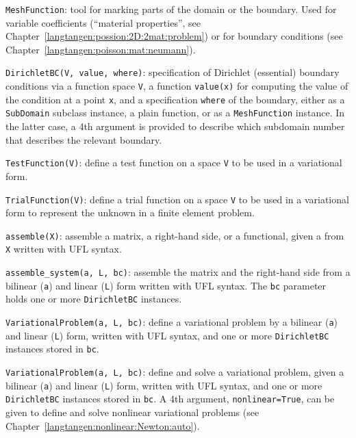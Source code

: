 {\fontsize{12pt}{12pt}\texttt{MeshFunction}}: tool for marking parts of the domain or the boundary.
Used for variable coefficients (``material properties'', see
Chapter~\ref{langtangen:possion:2D:2mat:problem}) or for
boundary conditions (see Chapter~\ref{langtangen:poisson:mat:neumann}).\gln

{\fontsize{12pt}{12pt}\texttt{DirichletBC(V, value, where)}}: specification of Dirichlet (essential)
boundary conditions via a function space {\fontsize{12pt}{12pt}\texttt{V}}, a function
{\fontsize{12pt}{12pt}\texttt{value(x)}} for computing the value of the condition at a point {\fontsize{12pt}{12pt}\texttt{x}},
and a specification {\fontsize{12pt}{12pt}\texttt{where}} of the boundary, either as a
{\fontsize{12pt}{12pt}\texttt{SubDomain}} subclass instance, a plain function, or as a 
{\fontsize{12pt}{12pt}\texttt{MeshFunction}} instance.
In the latter case, a 4th argument is provided to describe which subdomain
number that describes the relevant boundary.\gln

{\fontsize{12pt}{12pt}\texttt{TestFunction(V)}}: define a test function on a space {\fontsize{12pt}{12pt}\texttt{V}} to be used
in a variational form.\gln

{\fontsize{12pt}{12pt}\texttt{TrialFunction(V)}}: define a trial function on a space {\fontsize{12pt}{12pt}\texttt{V}} to be used
in a variational form to represent the unknown in a finite element problem.\gln

{\fontsize{12pt}{12pt}\texttt{assemble(X)}}: assemble a matrix, a right-hand side, or a functional,
given a from {\fontsize{12pt}{12pt}\texttt{X}} written with UFL syntax.\gln

{\fontsize{12pt}{12pt}\verb!assemble_system(a, L, bc)!}: assemble the matrix and the right-hand
side from a bilinear ({\fontsize{12pt}{12pt}\texttt{a}}) and linear ({\fontsize{12pt}{12pt}\texttt{L}}) form written with UFL
syntax. The {\fontsize{12pt}{12pt}\texttt{bc}} parameter holds one or more {\fontsize{12pt}{12pt}\texttt{DirichletBC}} instances.\gln

{\fontsize{12pt}{12pt}\texttt{VariationalProblem(a, L, bc)}}: define a variational problem by
a bilinear ({\fontsize{12pt}{12pt}\texttt{a}}) and linear ({\fontsize{12pt}{12pt}\texttt{L}}) form, written with UFL
syntax, and one or more {\fontsize{12pt}{12pt}\texttt{DirichletBC}} instances stored in {\fontsize{12pt}{12pt}\texttt{bc}}.\gln

{\fontsize{12pt}{12pt}\texttt{VariationalProblem(a, L, bc)}}: define and solve a variational problem,
given a bilinear ({\fontsize{12pt}{12pt}\texttt{a}}) and linear ({\fontsize{12pt}{12pt}\texttt{L}}) form, written with UFL
syntax, and one or more {\fontsize{12pt}{12pt}\texttt{DirichletBC}} instances stored in {\fontsize{12pt}{12pt}\texttt{bc}}.
A 4th argument, {\fontsize{12pt}{12pt}\texttt{nonlinear=True}}, can be given to define and solve
nonlinear variational problems (see Chapter~\ref{langtangen:nonlinear:Newton:auto}).\gln

